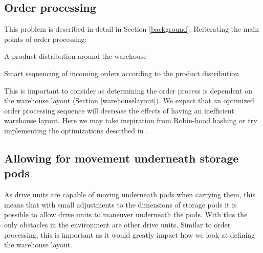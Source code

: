\documentclass[a4paper,11pt]{article}
\begin{document}
\subsection{Order processing}
\label{orderprocessing}
This problem is described in detail in Section \ref{background}. Reiterating the main points of order processing:

\begin{compactitem}
	\item A product distribution around the warehouse
	\item Smart sequencing of incoming orders according to the product distribution
\end{compactitem}

\noindent This is important to consider as determining the order process is dependent on the warehouse layout (Section \ref{warehouselayout}). We expect that an optimized order processing sequence will decrease the effects of having an inefficient warehouse layout. Here we may take inspiration from Robin-hood hashing or try implementing the optimizations described in \cite{boysen2017parts}.

\subsection{Allowing for movement underneath storage pods}
\label{beneathpods}
As drive units are capable of moving underneath pods when carrying them, this means that with small adjustments to the dimensions of storage pods it is possible to allow drive units to maneuver underneath the pods. With this the only obstacles in the environment are other drive units. Similar to order processing, this is important as it would greatly impact how we look at defining the warehouse layout.
\end{document}
